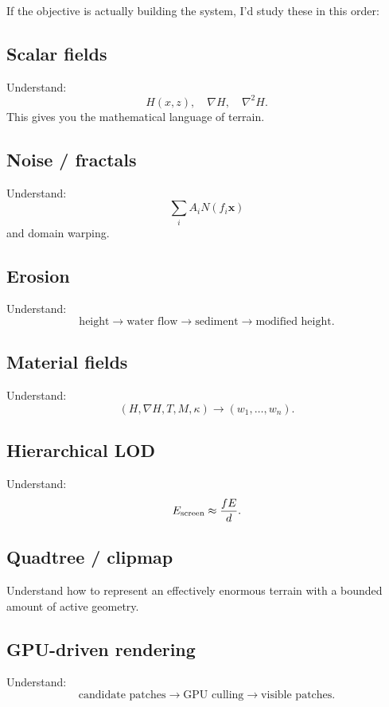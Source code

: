 \documentclass[12pt]{article}
\begin{document}
	If the objective is actually building the system, I'd study these in this order:
	
	\subsection{Scalar fields}
	
	Understand:
	\[
	H(x,z),\quad \nabla H,\quad \nabla^2H.
	\]
	This gives you the mathematical language of terrain.
	
	\subsection{Noise / fractals}
	
	Understand:
	\[
	\sum_i A_i N(f_i \mathbf x)
	\]
	and domain warping.
	
	\subsection{Erosion}
	
	Understand:
	\[
	\text{height} \rightarrow \text{water flow} \rightarrow \text{sediment} \rightarrow \text{modified height}.
	\]
	
	\subsection{Material fields}
	
	Understand:
	\[
	(H,\nabla H,T,M,\kappa) \rightarrow (w_1,\ldots,w_n).
	\]
	
	\subsection{Hierarchical LOD}
	
	Understand:
	\[
	E_{\rm screen} \approx \frac{fE}{d}.
	\]
	
	\subsection{Quadtree / clipmap}
	
	Understand how to represent an effectively enormous terrain with a bounded amount of active geometry.
	
	\subsection{GPU-driven rendering}
	
	Understand:
	\[
	\text{candidate patches} \rightarrow \text{GPU culling} \rightarrow \text{visible patches}.
	\]
	
\end{document}
